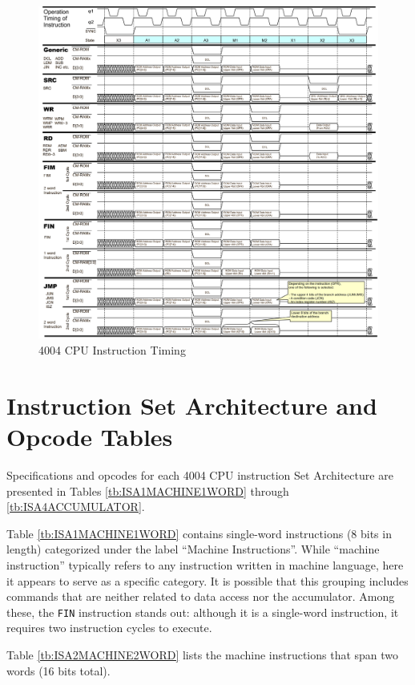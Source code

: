 \begin{figure}[htbp]
    \includegraphics[width=1.0\columnwidth]{./Figure/CPUInstructionTiming.png}
    \caption{4004 CPU Instruction Timing}
    \label{fig:CPUINSTRUCTIONTIMING}
\end{figure}
\section{Instruction Set Architecture and Opcode Tables}
Specifications and opcodes for each 4004 CPU instruction Set Architecture are presented in Tables \ref{tb:ISA1MACHINE1WORD} through \ref{tb:ISA4ACCUMULATOR}.

Table \ref{tb:ISA1MACHINE1WORD} contains single-word instructions (8 bits in length) categorized under the label ``Machine Instructions''. While ``machine instruction'' typically refers to any instruction written in machine language, here it appears to serve as a specific category. It is possible that this grouping includes commands that are neither related to data access nor the accumulator. Among these, the \texttt{FIN} instruction stands out: although it is a single-word instruction, it requires two instruction cycles to execute.

Table \ref{tb:ISA2MACHINE2WORD} lists the machine instructions that span two words (16 bits total).

